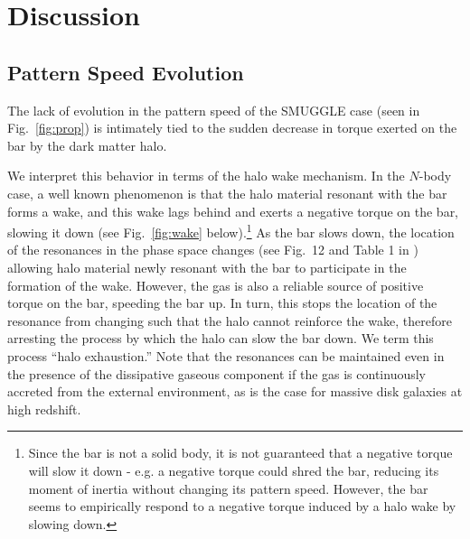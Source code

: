 \documentclass[twocolumn,linenumbers,trackchanges]{aastex631}
\newcommand{\Nbody}{$N$-body}
\newcommand{\SMUGGLE}{SMUGGLE}
\begin{document}
\section{Discussion}
\label{sec:discussion}
\subsection{Pattern Speed Evolution}
The lack of evolution in the pattern speed of the \SMUGGLE{} case (seen in
Fig.~\ref{fig:prop}) is intimately tied to the sudden decrease in torque exerted
on the bar by the dark matter halo. 

We interpret this behavior in terms of the halo wake mechanism. In the
\Nbody{} case, a well known phenomenon is that the halo material resonant with
the bar forms a wake, and this wake lags behind \citep{1984MNRAS.209..729T,
1985MNRAS.213..451W, 1992ApJ...400...80H} and exerts a negative torque on the
bar, slowing it down (see Fig.~\ref{fig:wake} below).\footnote{Since the bar is not a solid
body, it is not guaranteed that a negative torque will slow it down - e.g. a
negative torque could shred the bar, reducing its moment of inertia without
changing its pattern speed. However, the bar seems to empirically respond to a
negative torque induced by a halo wake by slowing down.} As the bar slows down,
the location of the resonances in the phase space changes (see Fig.~12 and Table
1 in \citet{2020ApJ...890..117D}) allowing halo material newly resonant with the
bar to participate in the formation of the wake. However, the gas is also a
reliable source of positive torque on the bar, speeding the bar up. In turn,
this stops the location of the resonance from changing such that the halo cannot
reinforce the wake, therefore arresting the process by which the halo can slow
the bar down. We term this process ``halo exhaustion.'' Note that the resonances
can be maintained even in the presence of the dissipative gaseous component if
the gas is continuously accreted from the external environment, as is the case
for massive disk galaxies at high redshift.

\end{document}
